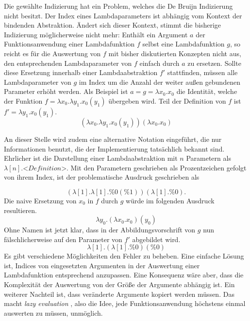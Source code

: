  Die gewählte Indizierung hat ein Problem, welches die De Bruijn Indizierung nicht besitzt. Der Index eines Lambdaparameters ist abhängig vom Kontext der bindenden Abstraktion. Ändert sich dieser Kontext, stimmt die bisherige Indizierung möglicherweise nicht mehr:
 Enthält ein Argument $a$ der Funktionsanwendung einer Lambdafunktion $f$ selbst eine Lambdafunktion $g$, so reicht es für die Auswertung von $f$ mit bisher diskutierten Konzepten nicht aus, den entsprechenden Lambdaparameter von $f$ einfach durch $a$ zu ersetzen. Sollte diese Ersetzung innerhalb einer Lambdaabstraktion $f'$ stattfinden, müssen alle Lambdaparameter von $g$ im Index um die Anzahl der weiter außen gebundenen Parameter erhöht werden. Als Beispiel ist $a = g = \lambda x_0 .x_0$ die Identität, welche der Funktion $f = \lambda x_0 .\lambda y_1 .x_0(y_1)$ übergeben wird. Teil der Definition von $f$ ist $f' = \lambda y_1 .x_0(y_1)$.
 $$(\lambda x_0 .\lambda y_1 .x_0(y_1))(\lambda x_0 .x_0)$$
 
 An dieser Stelle wird zudem eine alternative Notation eingeführt, die nur Informationen benutzt, die der Implementierung tatsächlich bekannt sind. Ehrlicher ist die Darstellung einer Lambdaabstraktion mit $n$ Parametern als $\lambda [n] .\textit{<Definition>}$. Mit den Parametern geschrieben als Prozentzeichen gefolgt von ihrem Index, ist der problematische Ausdruck geschrieben als
 
 $$(\lambda [1] .\lambda [1] .\%0(\%1))(\lambda [1] .\%0).$$
 Die naive Ersetzung von $x_0$ in $f$ durch $g$ würde im folgenden Ausdruck resultieren.
 $$\lambda y_0 .(\lambda x_0 .x_0)(y_0)$$
 Ohne Namen ist jetzt klar, dass in der Abbildungsvorschrift von $g$ nun fälschlicherweise auf den Parameter von $f'$ abgebildet wird.
 $$\lambda [1] .(\lambda [1] .\%0)(\%0)$$
 Es gibt verschiedene Möglichkeiten den Fehler zu beheben. Eine einfache Lösung ist, Indices von eingesetzten Argumenten in der Auswertung einer Lambdafunktion entsprechend anzupassen. Eine Konsequenz wäre aber, dass die Komplexität der Auswertung von der Größe der Argumente abhängig ist. Ein weiterer Nachteil ist, dass veränderte Argumente kopiert werden müssen. Das macht \textit{lazy evaluation} \cite{EvalStrategien}, also die Idee, jede Funktionsanwendung höchstens einmal auswerten zu müssen, unmöglich.
 
